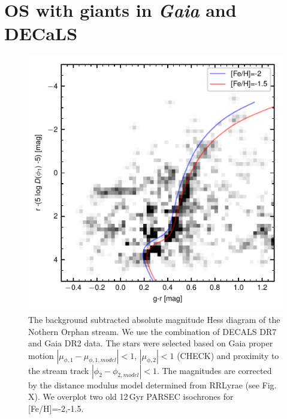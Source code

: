 \documentclass[a4paper,useAMS,usenatbib]{mnras}
\newcommand{\gaia}{\textit{Gaia} }
\begin{document}
\section{OS with giants in \gaia and DECaLS}

\begin{figure}
\includegraphics{decals_gaia_cmd.pdf}
\caption{The background subtracted absolute magnitude Hess diagram of the Nothern Orphan stream. We use the combination of DECALS DR7 and Gaia DR2 data. The stars 
were selected based on Gaia proper motion $|\mu_{\phi,1}-\mu_{\phi,1,model}|<1$,
$|\mu_{\phi,2}|<1$ (CHECK) and proximity to the stream track $|\phi_2 - \phi_{2,model}|<1$. The magnitudes are corrected by the distance modulus model determined from RRLyrae (see Fig. X). We overplot two old 12\,Gyr PARSEC isochrones for [Fe/H]=-2,-1.5.
}
\label{fig:cmd_decals}
\end{figure}
\end{document}
